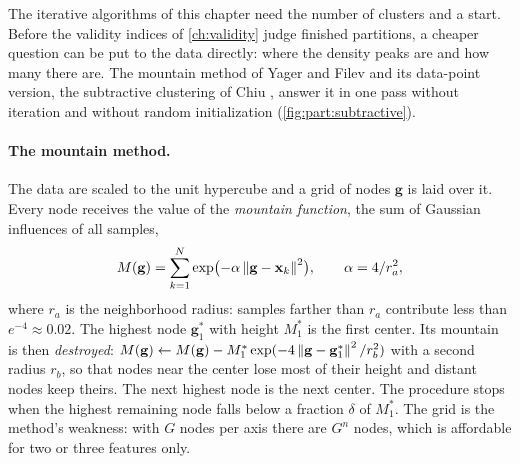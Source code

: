 The iterative algorithms of this chapter need the number of clusters and a start. Before the validity indices of \cref{ch:validity} judge finished partitions, a cheaper question can be put to the data directly: where the density peaks are and how many there are. The mountain method of Yager and Filev \cite{yager:1994:mountain} and its data-point version, the subtractive clustering of Chiu \cite{chiu:1994:subtractive}, answer it in one pass without iteration and without random initialization (\cref{fig:part:subtractive}).

\paragraph{The mountain method.} The data are scaled to the unit hypercube and a grid of nodes $\mathbf{g}$ is laid over it. Every node receives the value of the \emph{mountain function}, the sum of Gaussian influences of all samples,
\begin{equation}
  M(\mathbf{g})=\sum_{k=1}^{N}\exp\bigl(-\alpha\left\lVert \mathbf{g}-\mathbf{x}_k \right\rVert^2\bigr),\qquad\alpha=4/r_a^2,
  \label{eq:part:mountain}
\end{equation}
where $r_a$ is the neighborhood radius: samples farther than $r_a$ contribute less than $e^{-4}\approx0.02$. The highest node $\mathbf{g}^*_1$ with height $M^*_1$ is the first center. Its mountain is then \emph{destroyed}: $M(\mathbf{g})\leftarrow M(\mathbf{g})-M^*_1\exp(-4\left\lVert \mathbf{g}-\mathbf{g}^*_1 \right\rVert^2/r_b^2)$ with a second radius $r_b$, so that nodes near the center lose most of their height and distant nodes keep theirs. The next highest node is the next center. The procedure stops when the highest remaining node falls below a fraction $\delta$ of $M^*_1$. The grid is the method's weakness: with $G$ nodes per axis there are $G^n$ nodes, which is affordable for two or three features only.

